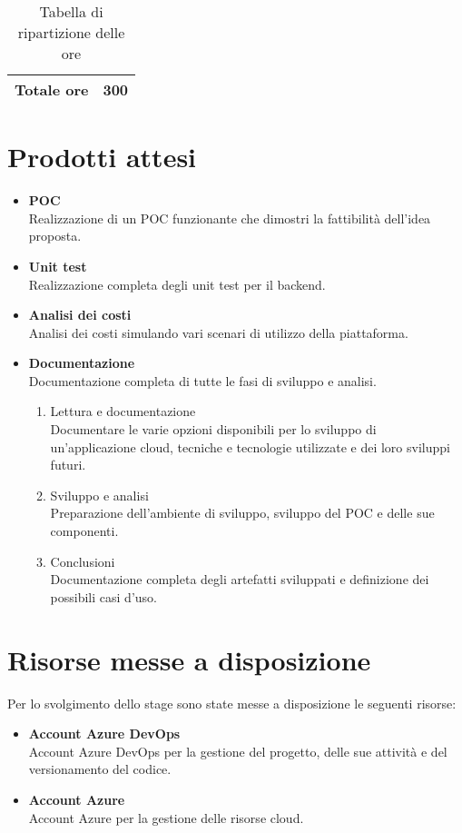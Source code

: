\begin{table}[!h]
\begin{tabularx}{\textwidth}{|c|X|}
        \textbf{Totale ore} & \multicolumn{1}{|c|}{\textbf{300}} \\\hline
        
        
    \end{tabularx}
    \caption{Tabella di ripartizione delle ore}

\end{table}
\section{Prodotti attesi}
\label{sec:prodotti-attesi}
\begin{itemize}
    \item \textbf{POC} \\
    Realizzazione di un POC funzionante che dimostri la fattibilità dell'idea proposta.
    \item \textbf{Unit test} \\
    Realizzazione completa degli unit test per il backend.\\
    \item \textbf{Analisi dei costi} \\
    Analisi dei costi simulando vari scenari di utilizzo della piattaforma.\\
    \item \textbf{Documentazione} \\
    Documentazione completa di tutte le fasi di sviluppo e analisi.
    \begin{enumerate}
        \item Lettura e documentazione \\
         Documentare le varie opzioni disponibili per lo sviluppo di un'applicazione cloud, tecniche e tecnologie utilizzate e dei loro sviluppi futuri.
        \item Sviluppo e analisi \\
        Preparazione dell'ambiente di sviluppo, sviluppo del POC e delle sue componenti.
        \item Conclusioni \\
        Documentazione completa degli artefatti sviluppati e definizione dei possibili casi d'uso.
    \end{enumerate}
\end{itemize}
\section{Risorse messe a disposizione}
\label{sec:risorse-messe-a-disposizione}
Per lo svolgimento dello stage sono state messe a disposizione le seguenti risorse:
\begin{itemize}
    \item \textbf{Account Azure DevOps} \\
    Account Azure DevOps per la gestione del progetto, delle sue attività e del versionamento del codice.
    \item \textbf{Account Azure} \\
    Account Azure per la gestione delle risorse cloud.
\end{itemize}

